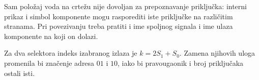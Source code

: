 Sam položaj voda na crtežu nije dovoljan za prepoznavanje priključka:
interni prikaz i simbol komponente mogu rasporediti iste priključke na različitim stranama.
Pri povezivanju treba pratiti i ime spoljnog signala i ime ulaza komponente na koji on dolazi.

Za dva selektora indeks izabranog izlaza je \(k=2S_1+S_0\).
Zamena njihovih uloga promenila bi značenje adresa \(01\) i \(10\),
iako bi pravougaonik i broj priključaka ostali isti.
